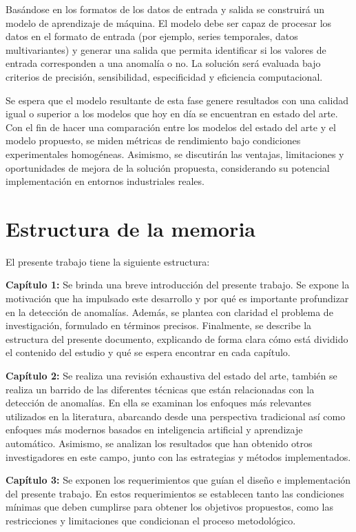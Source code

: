 \documentclass[11pt,a4paper,spanish]{book}
\numberwithin{equation}{chapter}
\numberwithin{figure}{chapter}
\begin{document}
Basándose en los formatos de los datos de entrada y salida se construirá un modelo 
de aprendizaje de máquina. 
El modelo debe ser capaz de procesar los datos en el formato de entrada 
(por ejemplo, series temporales, datos multivariantes) y generar una salida que permita
identificar si los valores de entrada corresponden a una anomalía o no. 
La solución será evaluada bajo criterios de precisión, sensibilidad, especificidad y 
eficiencia computacional.


Se espera que el modelo resultante de esta fase genere resultados con una calidad igual 
o superior a los modelos que hoy en día se encuentran en estado del  arte. Con el fin de
hacer una comparación entre los modelos del estado del arte y el modelo propuesto, se 
miden métricas de rendimiento bajo condiciones experimentales homogéneas. 
Asimismo, se discutirán las ventajas, limitaciones y oportunidades de mejora de la 
solución propuesta, considerando su potencial implementación en entornos industriales
reales.


\section{Estructura de la memoria}


El presente trabajo tiene la siguiente estructura:


\textbf{Capítulo 1:} Se brinda una breve introducción del presente trabajo. 
Se expone la motivación que ha impulsado este desarrollo y por qué es importante 
profundizar en la detección de anomalías. 
Además, se plantea con claridad el problema de investigación, formulado en términos 
precisos. 
Finalmente, se describe la estructura del presente documento, explicando de forma clara 
cómo está dividido el contenido del estudio y qué se espera encontrar en cada capítulo.


\textbf{Capítulo 2:} Se realiza una revisión exhaustiva del estado del arte, también se 
realiza un barrido de las diferentes técnicas que están relacionadas con la detección 
de anomalías. 
En ella se examinan los enfoques más relevantes utilizados en la literatura, abarcando 
desde una perspectiva tradicional así como enfoques más modernos basados en inteligencia 
artificial y aprendizaje automático. 
Asimismo, se analizan los resultados que han obtenido otros investigadores en este campo, 
junto con las estrategias y métodos implementados.


\textbf{Capítulo 3:} Se exponen los requerimientos que guían el diseño e implementación 
del presente trabajo.  En estos requerimientos se establecen tanto las condiciones mínimas 
que deben cumplirse para obtener los objetivos propuestos, como las restricciones y 
limitaciones que condicionan el proceso metodológico.
\end{document}
